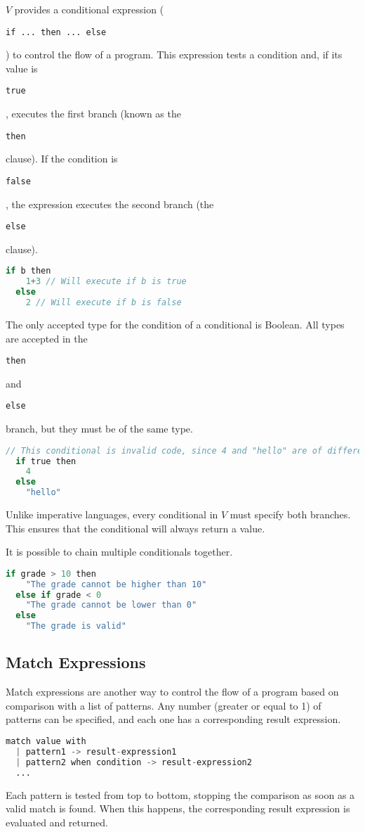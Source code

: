 \documentclass{article}
\def\code#1{\begin{footnotesize}\texttt{#1}\end{footnotesize}}
\begin{document}
$V$ provides a conditional expression (\code{if ... then ... else}) to control the flow of a program.
This expression tests a condition and, if its value is \code{true}, executes the first branch (known as the \code{then} clause).
If the condition is \code{false}, the expression executes the second branch (the \code{else} clause).

\begin{lstlisting}[language=V]
  if b then
    1+3 // Will execute if b is true
  else
    2 // Will execute if b is false
\end{lstlisting}

The only accepted type for the condition of a conditional is Boolean.
All types are accepted in the \code{then} and \code{else} branch, but they must be of the same type.

\begin{lstlisting}[language=V]
  // This conditional is invalid code, since 4 and "hello" are of different types
  if true then
    4
  else
    "hello"
\end{lstlisting}

Unlike imperative languages, every conditional in $V$ must specify both branches.
This ensures that the conditional will always return a value.

It is possible to chain multiple conditionals together.

\begin{lstlisting}[language=V]
  if grade > 10 then
    "The grade cannot be higher than 10"
  else if grade < 0
    "The grade cannot be lower than 0"
  else
    "The grade is valid"
\end{lstlisting}

\subsection{Match Expressions}

Match expressions are another way to control the flow of a program based on comparison with a list of patterns.
Any number (greater or equal to 1) of patterns can be specified, and each one has a corresponding result expression.

\begin{lstlisting}[language=V]
  match value with
  | pattern1 -> result-expression1
  | pattern2 when condition -> result-expression2
  ...
\end{lstlisting}

Each pattern is tested from top to bottom, stopping the comparison as soon as a valid match is found.
When this happens, the corresponding result expression is evaluated and returned.
\end{document}
